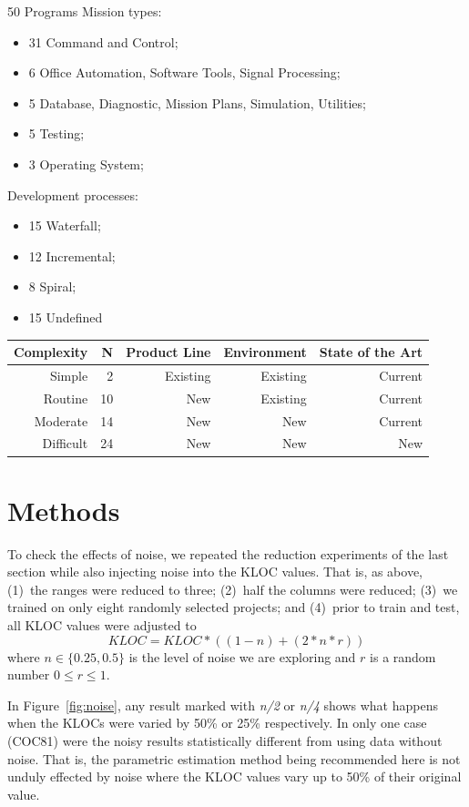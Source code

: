 \documentclass[final,twocolumn,5p]{elsarticle}
\newcommand{\bi}{\begin{itemize}[leftmargin=0.4cm]}
\newcommand{\ei}{\end{itemize}}
\newcommand{\fig}[1]{Figure~\ref{fig:#1}}
\theoremstyle{break}
\begin{document}
    50 Programs
    Mission types:
    \bi
  \item 31 Command and Control;
    \item 6 Office Automation, Software Tools, Signal Processing;
    \item 5 Database, Diagnostic, Mission Plans, Simulation, Utilities;
    \item 5 Testing;
    \item 3 Operating System;
      \ei
      
      Development processes:
      \bi
    \item 15 Waterfall;
    \item 12 Incremental;
    \item 8 Spiral;
    \item 15 Undefined
      \ei

      {\scriptsize
      \begin{tabular}{r|r|r|r|r}
      Complexity & N &  Product Line  & Environment & State of the Art\\\hline
Simple& 2& Existing& Existing &Current\\
Routine& 10& New& Existing& Current\\
Moderate& 14& New& New& Current\\
Difficult& 24& New& New& New\\
\end{tabular}}

        
 \section{Methods}
 To check the effects of noise, we repeated the reduction
experiments of the last section while also injecting
noise into the KLOC values.
That is, as above, 
(1)~the ranges were reduced to three;
(2)~half the columns were reduced;
(3)~we trained on only eight randomly selected projects; and 
(4)~prior to train and test, all KLOC values were adjusted
to
\[\mathit{KLOC} = \mathit{KLOC}*((1- n) + (2*n*r))\]
where $n \in \{0.25,0.5\}$ is the level of noise we are exploring and $r$ is a random number
$0 \le r \le 1$.

In \fig{noise}, any result
marked with {\em n/2} or {\em n/4} shows what happens
when the KLOCs were varied by 50\% or 25\% respectively.
In only one case (COC81) were the noisy results statistically
different from using data without noise. That is,
the parametric estimation method being recommended here is
not unduly effected by noise where the KLOC values
vary up to 50\% of their original value.
\end{document}

